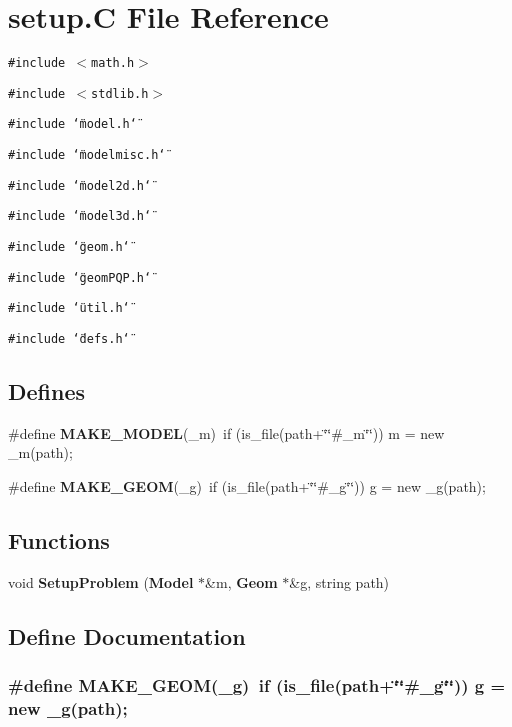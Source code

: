 \section{setup.C File Reference}
\label{setup_C}
{\tt \#include $<$math.h$>$}\par
{\tt \#include $<$stdlib.h$>$}\par
{\tt \#include \char`\"{}model.h\char`\"{}}\par
{\tt \#include \char`\"{}modelmisc.h\char`\"{}}\par
{\tt \#include \char`\"{}model2d.h\char`\"{}}\par
{\tt \#include \char`\"{}model3d.h\char`\"{}}\par
{\tt \#include \char`\"{}geom.h\char`\"{}}\par
{\tt \#include \char`\"{}geom\-PQP.h\char`\"{}}\par
{\tt \#include \char`\"{}util.h\char`\"{}}\par
{\tt \#include \char`\"{}defs.h\char`\"{}}\par
\subsection*{Defines}
\begin{CompactItemize}
\item 
\#define {\bf MAKE\_\-MODEL}(\_\-m)\ if (is\_\-file(path+\char`\"{}\char`\"{}\#\_\-m\char`\"{}\char`\"{})) m = new \_\-m(path);
\item 
\#define {\bf MAKE\_\-GEOM}(\_\-g)\ if (is\_\-file(path+\char`\"{}\char`\"{}\#\_\-g\char`\"{}\char`\"{})) g = new \_\-g(path);
\end{CompactItemize}
\subsection*{Functions}
\begin{CompactItemize}
\item 
void {\bf Setup\-Problem} ({\bf Model} $\ast$\&m, {\bf Geom} $\ast$\&g, string path)
\end{CompactItemize}


\subsection{Define Documentation}
\subsubsection{\setlength{\rightskip}{0pt plus 5cm}\#define MAKE\_\-GEOM(\_\-g)\ if (is\_\-file(path+\char`\"{}\char`\"{}\#\_\-g\char`\"{}\char`\"{})) g = new \_\-g(path);}\label{setup_C_a1}


